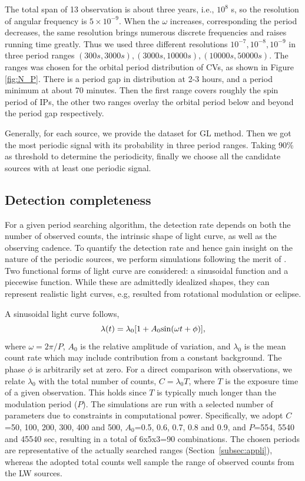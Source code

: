 \documentclass[fleqn,usenatbib]{mnras}
\begin{document}
The total span of 13 observation is about three years, i.e., $10^8$ s, so the resolution of angular frequency is $5\times 10^{-9}$. When the $\omega$ increases, corresponding the period decreases, the same resolution brings numerous discrete frequencies and raises running time greatly. Thus we used three different resolutions $10^{-7},10^{-8},10^{-9}$ in three period ranges $(300s,3000s),(3000s,10000s), (10000s,50000s)$. The ranges was chosen for the orbital period distribution of CVs, as shown in Figure \ref{fig:N_P}. There is a period gap in distribution at 2-3 hours, and a period minimum at about 70 minutes. Then the first range covers roughly the spin period of IPs, the other two ranges overlay the orbital period below and beyond the period gap respectively.

Generally, for each source, we provide the dataset for GL method. Then we got the most periodic signal with its probability in three period ranges. Taking 90\% as threshold to determine the periodicity, finally we choose all the candidate sources with at least one periodic signal.

\subsection{Detection completeness}\label{subsec:simulation}
For a given period searching algorithm, the detection rate depends on both the number of observed counts, the intrinsic shape of light curve, as well as the observing cadence. 
To quantify the detection rate and hence gain insight on the nature of the periodic sources, we perform simulations following the merit of \citet{1998ApJ...498..666C}. 
Two functional forms of light curve are considered: a sinusoidal function and a piecewise function. While these are admittedly idealized shapes, they can represent realistic light curves, e.g, resulted from rotational modulation or eclipse. 

A sinusoidal light curve follows,
\begin{equation}
\lambda (t)=\lambda_0[1+A_{0}{\rm sin}(\omega t+\phi)], 
\label{eqn:sin}
\end{equation}
where $\omega = 2{\pi}/P$, $A_0$ is the relative amplitude of variation, and $\lambda_0$ is the mean count rate which may include contribution from a constant background. The phase $\phi$ is arbitrarily set at zero.
For a direct comparison with observations, we relate $\lambda_0$ with the total number of counts, $C = \lambda_0 T$, where $T$ is the exposure time of a given observation. This holds since $T$ is typically much longer than the modulation period ($P$). 
The simulations are run with a selected number of parameters due to constraints in computational power. 
Specifically, we adopt $C$=50, 100, 200, 300, 400 and 500, $A_0$=0.5, 0.6, 0.7, 0.8 and 0.9, and $P$=554, 5540 and 45540 sec, resulting in a total of 6x5x3=90 combinations. 
The chosen periods are representative of the actually searched ranges (Section~\ref{subsec:appli}), whereas
the adopted total counts well sample the range of observed counts from the LW sources.
\end{document}
